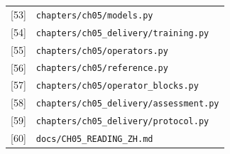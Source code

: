 \documentclass[a4paper,10pt]{article}
\begin{document}
\begin{longtable}{>{\raggedright\arraybackslash}p{}>{\raggedright\arraybackslash}p{}}
\leavevmode\hypertarget{source-53}{[53]} & \nolinkurl{chapters/ch05/models.py} \\[2pt]
\leavevmode\hypertarget{source-54}{[54]} & \nolinkurl{chapters/ch05_delivery/training.py} \\[2pt]
\leavevmode\hypertarget{source-55}{[55]} & \nolinkurl{chapters/ch05/operators.py} \\[2pt]
\leavevmode\hypertarget{source-56}{[56]} & \nolinkurl{chapters/ch05/reference.py} \\[2pt]
\leavevmode\hypertarget{source-57}{[57]} & \nolinkurl{chapters/ch05/operator_blocks.py} \\[2pt]
\leavevmode\hypertarget{source-58}{[58]} & \nolinkurl{chapters/ch05_delivery/assessment.py} \\[2pt]
\leavevmode\hypertarget{source-59}{[59]} & \nolinkurl{chapters/ch05_delivery/protocol.py} \\[2pt]
\leavevmode\hypertarget{source-60}{[60]} & \nolinkurl{docs/CH05_READING_ZH.md} \\[2pt]
\end{longtable}
\endgroup
\end{document}
